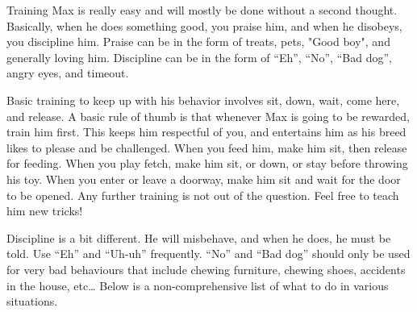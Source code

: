 \documentclass[pdftex,12pt]{article}
\begin{document}
\bigskip

Training Max is really easy and will mostly be done without a second thought.
Basically, when he does something good, you praise him,
and when he disobeys, you discipline him.
Praise can be in the form of treats, pets, "Good boy", and generally loving him.
Discipline can be in the form of ``Eh'', ``No'', ``Bad dog'', angry eyes, and timeout.

\bigskip

Basic training to keep up with his behavior involves sit, down, wait, come here, and release.
A basic rule of thumb is that whenever Max is going to be rewarded, train him first.
This keeps him respectful of you, and entertains him as his breed likes to please and be challenged.
When you feed him, make him sit, then release for feeding.
When you play fetch, make him sit, or down, or stay before throwing his toy.
When you enter or leave a doorway, make him sit and wait for the door to be opened.
Any further training is not out of the question.
Feel free to teach him new tricks!

\bigskip

Discipline is a bit different.
He will misbehave, and when he does, he must be told.
Use ``Eh'' and ``Uh-uh'' frequently.
``No'' and ``Bad dog'' should only be used for very bad behaviours that include chewing furniture, chewing shoes, accidents in the house, etc\ldots
Below is a non-comprehensive list of what to do in various situations.

\bigskip
\end{document}
